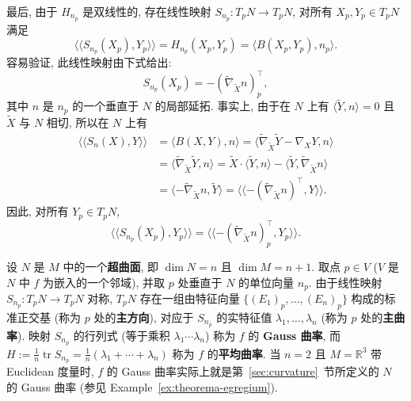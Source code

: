 最后, 由于 $H_{n_p}$ 是双线性的, 存在线性映射 $S_{n_p}:T_pN\to T_pN$, 对所有 $X_p,Y_p\in T_pN$ 满足
\[
  \langle\!\langle S_{n_p}(X_p),Y_p\rangle\!\rangle
  =H_{n_p}(X_p,Y_p)=\langle B(X_p,Y_p),n_p\rangle.
\]
容易验证, 此线性映射由下式给出:
\[
  S_{n_p}(X_p)=-(\widetilde\nabla_{\widetilde X}n)_p^\top,
\]
其中 $n$ 是 $n_p$ 的一个垂直于 $N$ 的局部延拓. 事实上, 由于在 $N$ 上有 $\langle\widetilde Y,n\rangle=0$ 且 $\widetilde X$ 与 $N$ 相切, 所以在 $N$ 上有
\begin{align*}
  \langle\!\langle S_n(X),Y\rangle\!\rangle
  &=\langle B(X,Y),n\rangle
  =\langle\widetilde\nabla_{\widetilde X}\widetilde Y-\nabla_XY,n\rangle\\
  &=\langle\widetilde\nabla_{\widetilde X}\widetilde Y,n\rangle
  =\widetilde X\cdot\langle\widetilde Y,n\rangle
    -\langle\widetilde Y,\widetilde\nabla_{\widetilde X}n\rangle\\
  &=\langle-\widetilde\nabla_{\widetilde X}n,\widetilde Y\rangle
    =\langle\!\langle-(\widetilde\nabla_{\widetilde X}n)^\top,Y\rangle\!\rangle.
\end{align*}
因此, 对所有 $Y_p\in T_pN$,
\[
  \langle\!\langle S_{n_p}(X_p),Y_p\rangle\!\rangle
    =\langle\!\langle-(\widetilde\nabla_{\widetilde X}n)_p^\top,Y_p\rangle\!\rangle.
\]

\begin{RiemannExample}\label{ex:principal-curvatures-of-hypersurface}
设 $N$ 是 $M$ 中的一个\textbf{超曲面}, 即 $\dim N=n$ 且 $\dim M=n+1$. 取点 $p\in V$ ($V$ 是 $N$ 中 $f$ 为嵌入的一个邻域), 并取 $p$ 处垂直于 $N$ 的单位向量 $n_p$. 由于线性映射 $S_{n_p}:T_pN\to T_pN$ 对称, $T_pN$ 存在一组由特征向量 $\{(E_1)_p,\ldots,(E_n)_p\}$ 构成的标准正交基 (称为 $p$ 处的\textbf{主方向}), 对应于 $S_{n_p}$ 的实特征值 $\lambda_1,\ldots,\lambda_n$ (称为 $p$ 处的\textbf{主曲率}). 映射 $S_{n_p}$ 的行列式 (等于乘积 $\lambda_1\cdots\lambda_n$) 称为 $f$ 的 \textbf{Gauss 曲率}, 而 $H:=\frac1n\operatorname{tr}S_{n_p}=\frac1n(\lambda_1+\cdots+\lambda_n)$ 称为 $f$ 的\textbf{平均曲率}. 当 $n=2$ 且 $M=\mathbb{R}^3$ 带 Euclidean 度量时, $f$ 的 Gauss 曲率实际上就是第~\ref{sec:curvature}~节所定义的 $N$ 的 Gauss 曲率 (参见 Example~\ref{ex:theorema-egregium}).
\end{RiemannExample}

